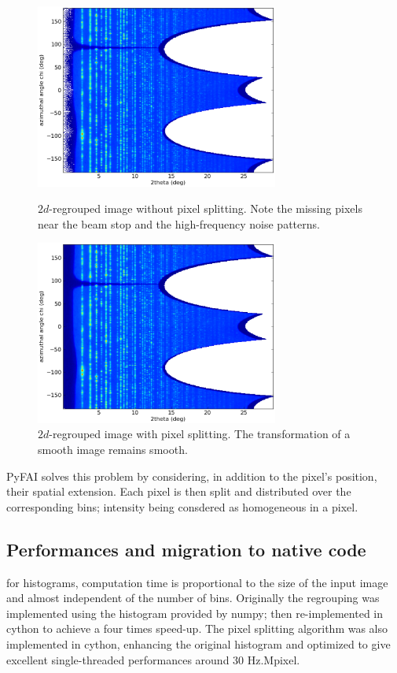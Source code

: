 \documentclass[a4paper]{jpconf}
\begin{document}
\begin{figure}[h]
\begin{center}
\begin{minipage}{8cm}
\includegraphics[width=8cm]{img/2Dhistogram.eps}
\caption{\label{rough}$2d$-regrouped image without pixel splitting. Note the
missing pixels near the beam stop and the high-frequency noise patterns.}
\end{minipage}\hspace{5mm}
\begin{minipage}{8cm}
\includegraphics[width=8cm]{img/2DwithSplit.eps}
\caption{\label{smooth}$2d$-regrouped image with pixel splitting. The
transformation of a smooth image remains smooth.}
\end{minipage}
\end{center}
\end{figure}

PyFAI solves this problem by considering, in addition to the pixel's position,
their spatial extension. Each pixel is then split and distributed over the
corresponding bins; intensity being consdered as homogeneous in a pixel.

\subsection{Performances and migration to native code}
for histograms, computation time is proportional to the size of the input image
and almost independent of the number of bins. Originally the regrouping was implemented
using the histogram provided by numpy\cite{numpy}; then re-implemented in
cython\cite{cython} to achieve a four times speed-up.
The pixel splitting algorithm was also implemented in cython, enhancing the
original histogram and optimized to give excellent single-threaded performances
around 30 Hz.Mpixel.
\end{document}
